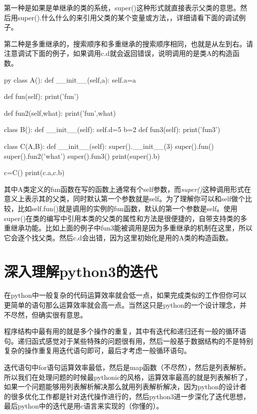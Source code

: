 \documentclass[12pt,oneside]{book}
\begin{document}
\begin{common-format}
第一种是如果是单继承的类的系统，super()这种形式就直接表示父类的意思。然后用super().什么什么的来引用父类的某个变量或方法，，详细请看下面的调试例子。

第二种是多重继承的，搜索顺序和多重继承的搜索顺序相同，也就是从左到右。请注意调试下面的例子，如果调用c.d就会返回错误，说明调用的是类A的构造函数。

\begin{xverbatim}[129]{py}
class A():
    def __init__(self,a):
        self.a=a

    def fun(self):
        print('fun')

    def fun2(self,what):
        print('fun',what)

class B():
    def __init__(self):
        self.d=5
    b=2
    def fun3(self):
        print('fun3')

class C(A,B):
    def __init__(self):
        super().__init__(3)
        super().fun()
        super().fun2('what')
        super().fun3()
        print(super().b)

c=C()
print(c.a,c.b)
\end{xverbatim}

其中A类定义的fun函数在写的函数上通常有个self参数，而\emph{super()}这种调用形式在意义上表示其的父类，同时默认第一个参数就是self。为了理解你可以和self做个比较，比如self.fun()就是调用的实例的fun函数，默认的第一个参数是self。使用super()在类的编写中引用本类的父类的属性和方法是很便捷的，自带支持类的多重继承功能。比如上面的例子中fun3能被调用是因为多重继承的机制在这里，所以它会逐个找父类。然后c.d会出错，因为这里初始化是用的A类的构造函数。




\chapter{深入理解python3的迭代}
\label{sec:深入理解python3的迭代}
在python中一般复杂的代码运算效率就会低一点，如果完成类似的工作但你可以更简单的语句那么运算效率就会高一点。当然这只是python的一个设计理念，并不尽然，但确实很有意思。

程序结构中最有用的就是多个操作的重复，其中有迭代和递归还有一般的循环语句。递归函式感觉对于某些特殊的问题很有用，然后一般基于数据结构的不是特别复杂的操作重复用迭代语句即可，最后才考虑一般循环语句。

迭代语句中for语句运算效率最低，然后是map函数（不尽然），然后是列表解析。所以我们在处理问题的时候最pythonic的风格，运算效率最高的就是列表解析了，如果一个问题能够用列表解析解决那么就用列表解析解决，因为python的设计者的很多优化工作都是针对迭代操作进行的，然后python3进一步深化了迭代思想，最后python中的迭代是用c语言来实现的（你懂的）。


\end{common-format}
\end{document}
